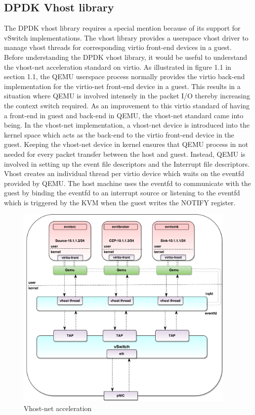 \subsection{DPDK Vhost library}
The DPDK vhost library requires a special mention because of its support for vSwitch implementations. The vhost library provides a userspace vhost driver to manage vhost threads for corresponding virtio front-end devices in a guest. Before understanding the DPDK vhost library, it would be useful to understand the vhost-net acceleration standard on virtio. As illustrated in figure 1.1 in section 1.1, the QEMU userspace process normally provides the virtio back-end implementation for the virtio-net front-end device in a guest. This results in a situation where QEMU is involved intensely in the packet I/O thereby increasing the context switch required. As an improvement to this virtio standard of having a front-end in guest and back-end in QEMU, the vhost-net standard came into being. In the vhost-net implementation, a vhost-net device is introduced into the kernel space which acts as the back-end to the virtio front-end device in the guest. Keeping the vhost-net device in kernel ensures that QEMU process in not needed for every packet transfer between the host and guest. Instead, QEMU is involved in setting up the event file descriptors and the Interrupt file descriptors. Vhost creates an individual thread per virtio device which waits on the eventfd provided by QEMU. The host machine uses the eventfd to communicate with the guest by binding the eventfd to an interrupt source or listening to the eventfd which is triggered by the KVM when the guest writes the NOTIFY register. 

 \begin{figure}[H]
 \centering
 \caption{Vhost-net acceleration}
 \includegraphics[height=10cm]{vhostnet.pdf}
\end{figure}

